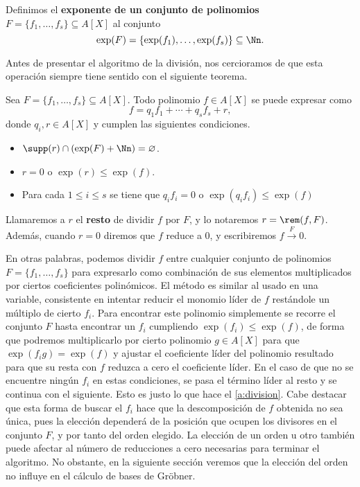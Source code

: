 \begin{definicion}
    Definimos el \textbf{exponente de un conjunto de polinomios} $F=\{f_1,\dots, f_s\} \subseteq A[X]$ al conjunto
    $$\exp(F) = \{\exp(f_1), \dots, \exp(f_s)\}\subseteq \Nn.$$
\end{definicion}

Antes de presentar el algoritmo de la división, nos cercioramos de que esta operación siempre tiene sentido con el siguiente teorema.
\begin{teorema}
    Sea $F=\{f_1,\dots, f_s\} \subseteq A[X]$. Todo polinomio $f\in A[X]$ se puede expresar como
    \begin{equation*}
        f = q_1f_1 + \cdots + q_sf_s + r,
    \end{equation*}
    donde $q_i, r\in A[X]$ y cumplen las siguientes condiciones.
    \begin{itemize}
        \item $\supp(r)\cap \left( \exp(F) + \Nn \right) = \varnothing$.
        \item $r=0$ o $\exp(r)\le \exp(f)$.
        \item Para cada $1\le i \le s$ se tiene que $q_if_i=0$ o $\exp(q_if_i)\le \exp(f)$
    \end{itemize}
    Llamaremos a $r$ el \textbf{resto} de dividir $f$ por $F$, y lo notaremos $r = \rem(f, F)$. Además, cuando $r=0$ diremos que $f$ reduce a $0$, y escribiremos $f \stackrel{F}{\to} 0$.
\end{teorema}

En otras palabras, podemos dividir $f$ entre cualquier conjunto de polinomios $F=\{f_1, \dots, f_s\}$ para expresarlo como combinación de sus elementos multiplicados por ciertos coeficientes polinómicos. El método es similar al usado en una variable, consistente en intentar reducir el monomio líder de $f$ restándole un múltiplo de cierto $f_i$. Para encontrar este polinomio simplemente se recorre el conjunto $F$ hasta encontrar un $f_i$ cumpliendo $\exp(f_i) \le \exp(f)$, de forma que podremos multiplicarlo por cierto polinomio $g\in A[X]$ para que $\exp(f_ig) = \exp(f)$ y ajustar el coeficiente líder del polinomio resultado para que su resta con $f$ reduzca a cero el coeficiente líder. En el caso de que no se encuentre ningún $f_i$ en estas condiciones, se pasa el término líder al resto y se continua con el siguiente. Esto es justo lo que hace el \autoref{a:division}. Cabe destacar que esta forma de buscar el $f_i$ hace que la descomposición de $f$ obtenida no sea única, pues la elección dependerá de la posición que ocupen los divisores en el conjunto $F$, y por tanto del orden elegido. La elección de un orden u otro también puede afectar al número de reducciones a cero necesarias para terminar el algoritmo. No obstante, en la siguiente sección veremos que la elección del orden no influye en el cálculo de bases de Gröbner.

